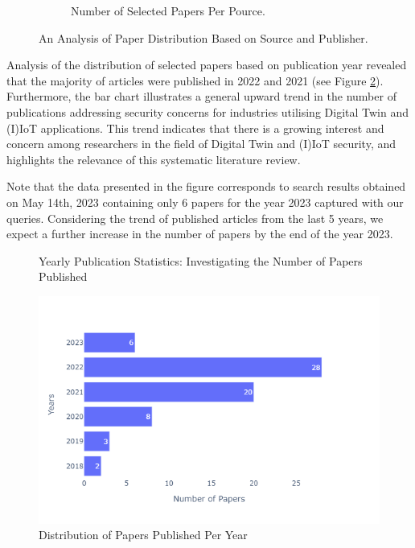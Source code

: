 \begin{figure}[H]
\begin{subfigure}[b]{0.45\textwidth}
        \caption{Number of Selected Papers Per Pource.}
    \end{subfigure}
    \caption{An Analysis of Paper Distribution Based on Source and Publisher.}
    \label{fig:archive-itemtype}
\end{figure}
 
Analysis of the distribution of selected papers based on publication year revealed that the majority of articles were published in 2022 and 2021 (see Figure \ref{fig:bar-chart-yaer}). Furthermore, the bar chart illustrates a general upward trend in the number of publications addressing security concerns for industries utilising Digital Twin and (I)IoT applications. This trend indicates that there is a growing interest and concern among researchers in the field of Digital Twin and (I)IoT security, and highlights the relevance of this systematic literature review.

Note that the data presented in the figure corresponds to search results obtained on May 14th, 2023 containing only 6 papers for the year 2023 captured with our queries. Considering the trend of published articles from the last 5 years, we expect a further increase in the number of papers by the end of the year 2023. 

\begin{figure}[H]    
    \caption{Yearly Publication Statistics: Investigating the Number of Papers Published}
    \includegraphics[width=\textwidth]{images/newimages/barchart-year.png}
    \caption{Distribution of Papers Published Per Year}
    \label{fig:bar-chart-yaer}
\end{figure}

